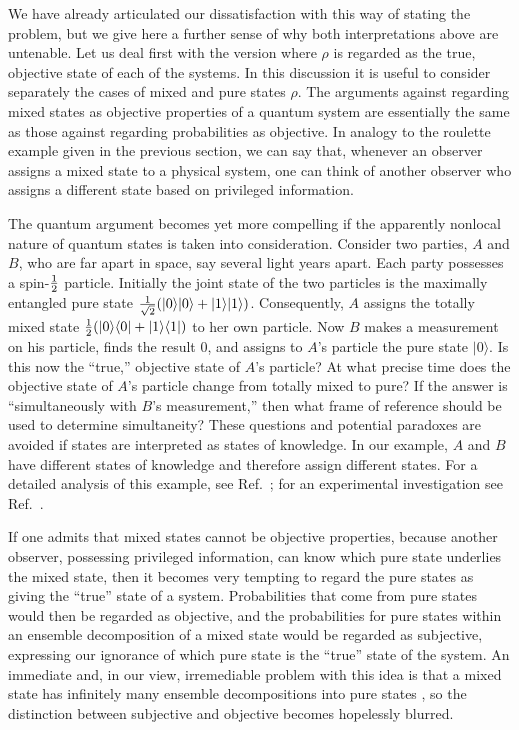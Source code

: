 \documentclass[12pt,aps,eqsecnum]{revtex4-1}
\begin{document}
We have already articulated our dissatisfaction with this way of
stating the problem, but we give here a further sense of why both
interpretations above are untenable.  Let us deal first with the
version where $\rho$ is regarded as the true, objective state of
each of the systems.  In this discussion it is useful to consider
separately the cases of mixed and pure states $\rho$.  The
arguments against regarding mixed states as objective properties
of a quantum system are essentially the same as those against
regarding probabilities as objective. In analogy to the roulette
example given in the previous section, we can say that, whenever
an observer assigns a mixed state to a physical system, one can
think of another observer who assigns a different state based on
privileged information.

The quantum argument becomes yet more compelling if the apparently
nonlocal nature of quantum states is taken into consideration.
Consider two parties, $A$ and $B$, who are far apart in space, say
several light years apart. Each party possesses a spin-$1\over 2$
particle. Initially the joint state of the two particles is the
maximally entangled pure state
${1\over\sqrt2}(|0\rangle|0\rangle+|1\rangle|1\rangle)$.
Consequently, $A$ assigns the totally mixed state
${1\over2}(|0\rangle\langle0|+|1\rangle\langle1|)$ to her own
particle. Now $B$ makes a measurement on his particle, finds the
result 0, and assigns to $A$'s particle the pure state
$|0\rangle$. Is this now the ``true,'' objective state of $A$'s
particle? At what precise time does the objective state of $A$'s
particle change from totally mixed to pure?  If the answer is
``simultaneously with $B$'s measurement,'' then what frame of
reference should be used to determine simultaneity?  These
questions and potential paradoxes are avoided if states are
interpreted as states of knowledge. In our example, $A$ and $B$
have different states of knowledge and therefore assign different
states. For a detailed analysis of this example, see
Ref.~\cite{Peres-9906a}; for an experimental investigation see
Ref.~\cite{Scarani2000}.

If one admits that mixed states cannot be objective properties,
because another observer, possessing privileged information, can
know which pure state underlies the mixed state, then it becomes
very tempting to regard the pure states as giving the ``true''
state of a system.  Probabilities that come from pure states would
then be regarded as objective, and the probabilities for pure
states within an ensemble decomposition of a mixed state would be
regarded as subjective, expressing our ignorance of which pure
state is the ``true'' state of the system.  An immediate and, in
our view, irremediable problem with this idea is that a mixed
state has infinitely many ensemble decompositions into pure states
\cite{Jaynes1957b,Schrodinger1936,Hughston1993}, so the
distinction between subjective and objective becomes hopelessly
blurred.
\end{document}
